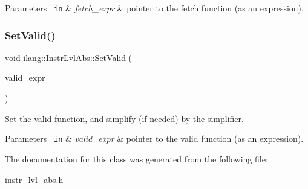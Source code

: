 \begin{DoxyParams}[1]{Parameters}
\mbox{\texttt{ in}}  & {\em fetch\+\_\+expr} & pointer to the fetch function (as an expression). \\
\hline
\end{DoxyParams}
\mbox{\label{classilang_1_1_instr_lvl_abs_a63d3f9a5566916ba4a682cbfbdaeb862}} 
\subsubsection{\texorpdfstring{Set\+Valid()}{SetValid()}}
{\footnotesize\ttfamily void ilang\+::\+Instr\+Lvl\+Abs\+::\+Set\+Valid (\begin{DoxyParamCaption}\item[{const \mbox{\hyperlink{namespaceilang_a7c4196c72e53ea4df4b7861af7bc3bce}{Expr\+Ptr}}}]{valid\+\_\+expr }\end{DoxyParamCaption})}



Set the valid function, and simplify (if needed) by the simplifier. 


\begin{DoxyParams}[1]{Parameters}
\mbox{\texttt{ in}}  & {\em valid\+\_\+expr} & pointer to the valid function (as an expression). \\
\hline
\end{DoxyParams}


The documentation for this class was generated from the following file\+:\begin{DoxyCompactItemize}
\item 
\mbox{\hyperlink{instr__lvl__abs_8h}{instr\+\_\+lvl\+\_\+abs.\+h}}\end{DoxyCompactItemize}

